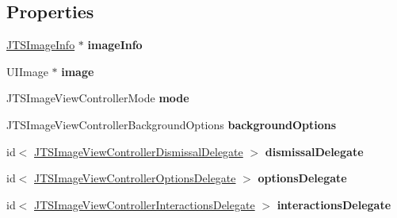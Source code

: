 \subsection*{Properties}
\begin{DoxyCompactItemize}
\item 
\hypertarget{interface_j_t_s_image_view_controller_a6d7282c6f002e46a37f015c09397a20c}{}\hyperlink{interface_j_t_s_image_info}{J\+T\+S\+Image\+Info} $\ast$ {\bfseries image\+Info}\label{interface_j_t_s_image_view_controller_a6d7282c6f002e46a37f015c09397a20c}

\item 
\hypertarget{interface_j_t_s_image_view_controller_a42be4e50b38a6992bac8ff6776ab6b99}{}U\+I\+Image $\ast$ {\bfseries image}\label{interface_j_t_s_image_view_controller_a42be4e50b38a6992bac8ff6776ab6b99}

\item 
\hypertarget{interface_j_t_s_image_view_controller_ae68f795d89e2a95bbc089f4cd6f4ee49}{}J\+T\+S\+Image\+View\+Controller\+Mode {\bfseries mode}\label{interface_j_t_s_image_view_controller_ae68f795d89e2a95bbc089f4cd6f4ee49}

\item 
\hypertarget{interface_j_t_s_image_view_controller_af583c6d0df7a369cb1e9ef8e0fd66842}{}J\+T\+S\+Image\+View\+Controller\+Background\+Options {\bfseries background\+Options}\label{interface_j_t_s_image_view_controller_af583c6d0df7a369cb1e9ef8e0fd66842}

\item 
\hypertarget{interface_j_t_s_image_view_controller_afe59cc939e2b214d538e9d0d41775ca5}{}id$<$ \hyperlink{protocol_j_t_s_image_view_controller_dismissal_delegate-p}{J\+T\+S\+Image\+View\+Controller\+Dismissal\+Delegate} $>$ {\bfseries dismissal\+Delegate}\label{interface_j_t_s_image_view_controller_afe59cc939e2b214d538e9d0d41775ca5}

\item 
\hypertarget{interface_j_t_s_image_view_controller_a0ba824119366f16ab39a4fd8b8f0f0f7}{}id$<$ \hyperlink{protocol_j_t_s_image_view_controller_options_delegate-p}{J\+T\+S\+Image\+View\+Controller\+Options\+Delegate} $>$ {\bfseries options\+Delegate}\label{interface_j_t_s_image_view_controller_a0ba824119366f16ab39a4fd8b8f0f0f7}

\item 
\hypertarget{interface_j_t_s_image_view_controller_a0819b988db72d5eebadcd397ae9b4546}{}id$<$ \hyperlink{protocol_j_t_s_image_view_controller_interactions_delegate-p}{J\+T\+S\+Image\+View\+Controller\+Interactions\+Delegate} $>$ {\bfseries interactions\+Delegate}\label{interface_j_t_s_image_view_controller_a0819b988db72d5eebadcd397ae9b4546}


\end{DoxyCompactItemize}
